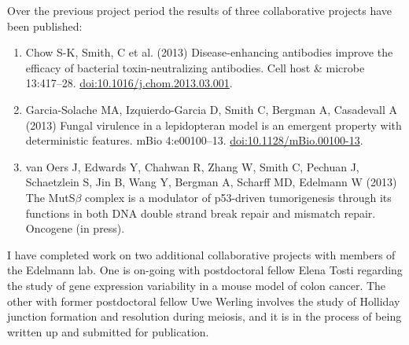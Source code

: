 \documentclass[11pt,letterpaper]{article}
\begin{document}
Over the previous project period the results of three collaborative projects have been published:

\begin{enumerate}
\item Chow S-K, Smith, C et al. (2013) Disease-enhancing antibodies improve the efficacy of bacterial toxin-neutralizing antibodies. Cell host \& microbe 13:417–28. \href{http://dx.doi.org/10.1016/j.chom.2013.03.001}{doi:10.1016/j.chom.2013.03.001}.
\item Garcia-Solache MA, Izquierdo-Garcia D, Smith C, Bergman A, Casadevall A (2013) Fungal virulence in a lepidopteran model is an emergent property with deterministic features. mBio 4:e00100–13. \href{http://dx.doi.org/10.1128/mBio.00100-13}{doi:10.1128/mBio.00100-13}.
\item van Oers J, Edwards Y, Chahwan R, Zhang W, Smith C, Pechuan J, Schaetzlein S, Jin B, Wang Y, Bergman A, Scharff MD, Edelmann W (2013) The MutS$\beta$ complex is a modulator of p53-driven tumorigenesis through its functions in both DNA double strand break repair and mismatch repair. Oncogene (in press).
\end{enumerate}

I have completed work on two additional collaborative projects with members of the Edelmann lab. One is on-going with postdoctoral fellow Elena Tosti regarding the study of gene expression variability in a mouse model of colon cancer. The other with former postdoctoral fellow Uwe Werling involves the study of Holliday junction formation and resolution during meiosis, and it is in the process of being written up and submitted for publication.
\end{document}
